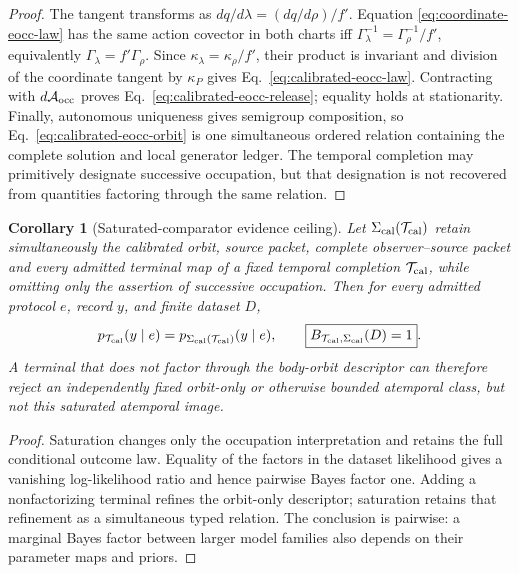 \documentclass[11pt]{article}
\newtheorem{corollary}{Corollary}
\begin{document}
\begin{proof}
The tangent transforms as \(dq/d\lambda=(dq/d\rho)/f'\).  Equation
\eqref{eq:coordinate-eocc-law} has the same action covector in both charts iff
\(\Gamma_\lambda^{-1}=\Gamma_\rho^{-1}/f'\), equivalently
\(\Gamma_\lambda=f'\Gamma_\rho\).  Since
\(\kappa_\lambda=\kappa_\rho/f'\), their product is invariant and division of
the coordinate tangent by \(\kappa_P\) gives
Eq.~\eqref{eq:calibrated-eocc-law}.  Contracting with
\(d\mathcal A_{\rm occ}\) proves
Eq.~\eqref{eq:calibrated-eocc-release}; equality holds at stationarity.
Finally, autonomous uniqueness gives semigroup composition, so
Eq.~\eqref{eq:calibrated-eocc-orbit} is one simultaneous ordered relation
containing the complete solution and local generator ledger.  The temporal
completion may primitively designate successive occupation, but that
designation is not recovered from quantities factoring through the same
relation.
\end{proof}

\begin{corollary}[Saturated-comparator evidence ceiling]
Let \(\Sigma_{\rm cal}(\mathcal T_{\rm cal})\) retain simultaneously the
calibrated orbit, source packet, complete observer--source packet and every
admitted terminal map of a fixed temporal completion
\(\mathcal T_{\rm cal}\), while omitting only the assertion of successive
occupation.  Then for every admitted protocol \(e\), record \(y\), and finite
dataset \(D\),
\begin{equation}
 p_{\mathcal T_{\rm cal}}(y\mid e)
 =p_{\Sigma_{\rm cal}(\mathcal T_{\rm cal})}(y\mid e),
 \qquad
 \boxed{B_{\mathcal T_{\rm cal},\Sigma_{\rm cal}}(D)=1}.
 \label{eq:calibrated-saturation-bayes-ceiling}
\end{equation}
A terminal that does not factor through the body-orbit descriptor can
therefore reject an independently fixed orbit-only or otherwise bounded
atemporal class, but not this saturated atemporal image.
\end{corollary}

\begin{proof}
Saturation changes only the occupation interpretation and retains the full
conditional outcome law.  Equality of the factors in the dataset likelihood
gives a vanishing log-likelihood ratio and hence pairwise Bayes factor one.
Adding a nonfactorizing terminal refines the orbit-only descriptor; saturation
retains that refinement as a simultaneous typed relation.  The conclusion is
pairwise: a marginal Bayes factor between larger model families also depends
on their parameter maps and priors.
\end{proof}
\end{document}
